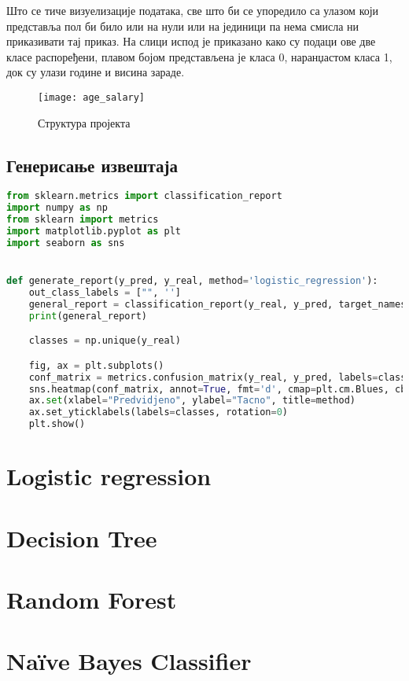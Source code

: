 \documentclass[11pt]{article} %
\begin{document}
Што се тиче визуелизације података, све што би се упоредило са улазом који представља пол би било или на нули или на јединици па нема смисла ни приказивати тај приказ. На слици испод је приказано како су подаци ове две класе распоређени, плавом бојом представљена је класа 0, наранџастом класа 1, док су улази године и висина зараде.

\begin{figure}[h]
\centering
	\texttt{[image: age\_salary]} 
	\caption{Структура пројекта} 
\end{figure}

\subsection{Генерисање извештаја}

\begin{lstlisting}[language=Python,title=Пример 3. /classifiers/utils.py - `генерисање извештаја`]
from sklearn.metrics import classification_report
import numpy as np
from sklearn import metrics
import matplotlib.pyplot as plt
import seaborn as sns


def generate_report(y_pred, y_real, method='logistic_regression'):
    out_class_labels = ["", '']
    general_report = classification_report(y_real, y_pred, target_names=out_class_labels)
    print(general_report)

    classes = np.unique(y_real)

    fig, ax = plt.subplots()
    conf_matrix = metrics.confusion_matrix(y_real, y_pred, labels=classes)
    sns.heatmap(conf_matrix, annot=True, fmt='d', cmap=plt.cm.Blues, cbar=False)
    ax.set(xlabel="Predvidjeno", ylabel="Tacno", title=method)
    ax.set_yticklabels(labels=classes, rotation=0)
    plt.show()


\end{lstlisting}

\section{Logistic regression}
\section{Decision Tree}
\section{Random Forest}
\section{Naïve Bayes Classifier}
\end{document}
